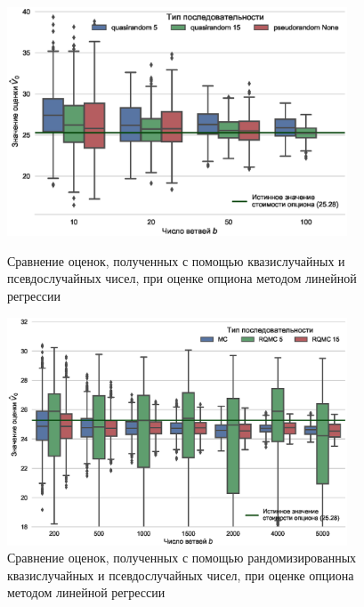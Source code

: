 \documentclass{article}
\begin{document}
\begin{figure}[p]
	\centering

	\includegraphics[width=0.9\textwidth]{LSM_QMC_MC.eps}
	\caption{Сравнение оценок, полученных с помощью квазислучайных и псевдослучайных чисел, при оценке опциона методом линейной регрессии}
	\label{fig:LSM_QMC_MC}

	\includegraphics[width=0.9\textwidth]{LSM_RQMC_MC.eps}
	\caption{Сравнение оценок, полученных с помощью рандомизированных квазислучайных и псевдослучайных чисел, при оценке опциона методом линейной регрессии}
	\label{fig:LSM_RQMC_MC}
\end{figure}
\end{document}
